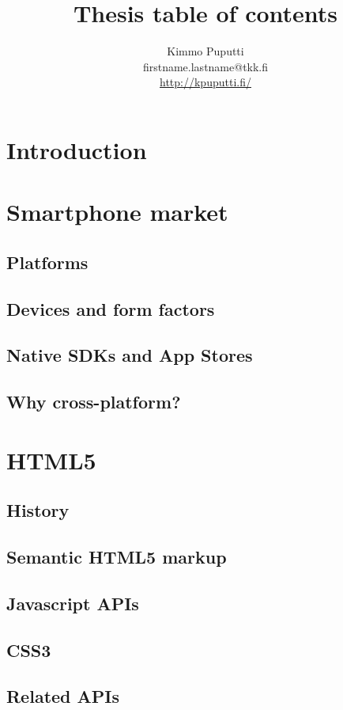 \documentclass[a4paper,12pt]{article}
\title{Thesis table of contents}
\author{Kimmo Puputti\\firstname.lastname@tkk.fi\\\url{http://kpuputti.fi/}}
\begin{document}
\maketitle
\thispagestyle{empty}

\clearpage
\tableofcontents

\section{Introduction}

\section{Smartphone market}

\subsection{Platforms}
\subsection{Devices and form factors}
\subsection{Native SDKs and App Stores}
\subsection{Why cross-platform?}

\section{HTML5}

\subsection{History}
\subsection{Semantic HTML5 markup}
\subsection{Javascript APIs}
\subsection{CSS3}
\subsection{Related APIs}
\end{document}
